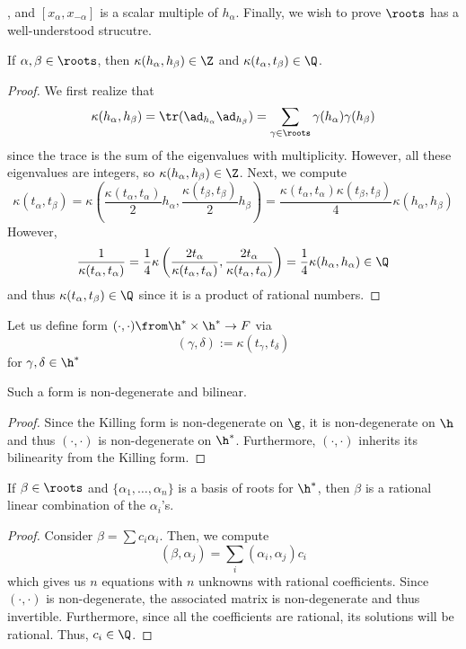 \documentclass[11pt,leqno,oneside]{amsart}
\numberwithin{thm}{section}
\begin{document}
\alpha\), and \([x_\alpha, x_{-\alpha}]\) is a scalar multiple of
\(h_\alpha\). Finally, we wish to prove \(\roots\) has a
well-understood strucutre.
\begin{lem}\label{killing-form-on-roots-is-rational}
  If \(\alpha,\beta \in \roots\), then \(\kappa(h_\alpha, h_\beta) \in
  \Z\) and \(\kappa(t_\alpha, t_\beta) \in \Q\).
\end{lem}
\begin{proof}
  We first realize that \[
    \kappa(h_\alpha, h_\beta) = \tr(\ad_{h_\alpha} \ad_{h_\beta}) =
    \sum_{\gamma \in \roots} \gamma(h_\alpha)\gamma(h_\beta)
  \]
  since the trace is the sum of the eigenvalues with
  multiplicity. However, all these eigenvalues are integers, so
  \(\kappa(h_\alpha, h_\beta) \in \Z\). Next, we compute \[
    \kappa(t_\alpha, t_\beta) =
    \kappa \left(\frac{\kappa(t_\alpha,t_\alpha)}{2}h_\alpha,
    \frac{\kappa(t_\beta,t_\beta)}{2} h_\beta \right) =
    \frac{\kappa(t_\alpha, t_\alpha) \kappa(t_\beta,
      t_\beta)}{4}\kappa(h_\alpha, h_\beta)
  \]
  However, \[
    \frac{1}{\kappa(t_\alpha, t_\alpha)} =
    \frac{1}{4}\kappa\left(\frac{2t_\alpha}{\kappa(t_\alpha,
      t_\alpha)},\frac{2t_\alpha}{\kappa(t_\alpha, t_\alpha)}\right) =
  \frac{1}{4}\kappa(h_\alpha,h_\alpha) \in \Q
  \]
  and thus \(\kappa(t_\alpha,t_\beta) \in \Q\) since it is a product
  of rational numbers.
\end{proof}
\begin{defn}
  Let us define form \((\cdot,\cdot) \from \h^* \times \h^* \to F\)
  via \[
    (\gamma, \delta) := \kappa(t_\gamma, t_\delta)
  \]
  for \(\gamma, \delta \in \h^*\)
\end{defn}
\begin{prop}
  Such a form is non-degenerate and bilinear.
\end{prop}
\begin{proof}
  Since the Killing form is non-degenerate on \(\g\), it is
  non-degenerate on \(\h\) and thus \((\cdot, \cdot)\) is
  non-degenerate on \(\h^*\). Furthermore, \((\cdot, \cdot)\) inherits
  its bilinearity from the Killing form. 
\end{proof}
\begin{lem}
  If \(\beta \in \roots\) and \(\{\alpha_1, \ldots, \alpha_n\}\) is a
  basis of roots for \(\h^*\), then \(\beta\) is a rational linear
  combination of the \(\alpha_i\)'s.
\end{lem}
\begin{proof}
  Consider \(\beta = \sum c_i \alpha_i\). Then, we compute \[
    (\beta, \alpha_j) = \sum_i (\alpha_i, \alpha_j)c_i
  \]
  which gives us \(n\) equations with \(n\) unknowns with rational
  coefficients. Since \((\cdot, \cdot)\) is non-degenerate, the
  associated matrix is non-degenerate and thus
  invertible. Furthermore, since all the coefficients are rational,
  its solutions will be rational. Thus, \(c_i \in \Q\).
\end{proof}
\end{document}
